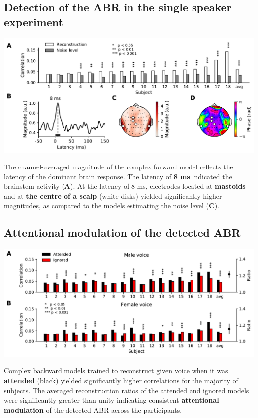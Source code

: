 \documentclass[a0,landscape]{a0poster}
\newenvironment{Figure}
  {\par\medskip\noindent\minipage{\linewidth}}
  {\endminipage\par\medskip}
\begin{document}
\begin{multicols*}{3}
\subsection*{Detection of the ABR in the single speaker experiment}
\begin{Figure}
\centering
\includegraphics[width=\linewidth,keepaspectratio]{Figure_1.pdf}
\end{Figure}
\begin{flushleft}
The channel-averaged magnitude of the complex forward model reflects the latency of the dominant brain response. The latency of \textbf{8 ms} indicated the brainstem activity (\textbf{A}). At the latency of 8 ms, electrodes located at \textbf{mastoids} and at \textbf{the centre of a scalp} (white disks) yielded significantly higher magnitudes, as compared to the models estimating the noise level (\textbf{C}).
\end{flushleft}


\subsection*{Attentional modulation of the detected ABR}
\begin{Figure}
\centering
\includegraphics[width=\linewidth,keepaspectratio]{Figure_3.pdf}
\end{Figure}
\begin{flushleft}
Complex backward models trained to reconstruct given voice when it was \textbf{attended} (black) yielded significantly higher correlations for the majority of subjects. The averaged reconstruction ratios of the attended and ignored models were significantly greater than unity indicating consistent \textbf{attentional modulation} of the detected ABR across the participants.
\end{flushleft}


\end{multicols*}
\end{document}
